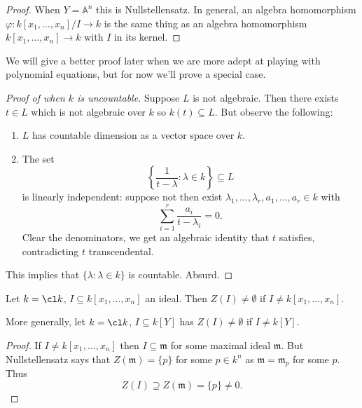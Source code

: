 \documentclass[a4paper]{article}
\renewcommand{\A}{\mathbb{A}}
\begin{document}
\begin{proof}
  When \(Y = \A^n\) this is Nullstellensatz. In general, an algebra homomorphism \(\varphi: k[x_1, \dots, x_n]/I \to k\) is the same thing as an algebra homomorphism \(k[x_1, \dots, x_n] \to k\) with \(I\) in its kernel.
\end{proof}

We will give a better proof later when we are more adept at playing with polynomial equations, but for now we'll prove a special case.

\begin{proof}[Proof of  when \(k\) is uncountable]
  Suppose \(L\) is not algebraic. Then there exists \(t \in L\) which is not algebraic over \(k\) so \(k(t) \subseteq L\). But observe the following:
  \begin{enumerate}
  \item \(L\) has countable dimension as a vector space over \(k\).
  \item The set
    \[
      \left\{ \frac{1}{t - \lambda}: \lambda \in k\right\} \subseteq L
    \]
    is linearly independent: suppose not then exist \(\lambda_1, \dots, \lambda_r, a_1, \dots, a_r \in k\) with
    \[
      \sum_{i = 1}^r \frac{a_i}{t - \lambda_i} = 0.
    \]
    Clear the denominators, we get an algebraic identity that \(t\) satisfies, contradicting \(t\) transcendental.
  \end{enumerate}
  This implies that \(\{\lambda: \lambda \in k\}\) is countable. Absurd.
\end{proof}


\begin{corollary}[Nullstellensatz]
  Let \(k = \cl k\), \(I \subseteq k[x_1, \dots, x_n]\) an ideal. Then \(Z(I) \neq \emptyset\) if \(I \neq k[x_1, \dots, x_n]\).

  More generally, let \(k = \cl k\), \(I \subseteq k[Y]\) has \(Z(I) \neq \emptyset\) if \(I \neq k[Y]\).
\end{corollary}

\begin{proof}
  If \(I \neq k[x_1, \dots, x_n]\) then \(I \subseteq \mathfrak m\) for some maximal ideal \(\mathfrak m\). But Nullstellensatz says that \(Z(\mathfrak m) = \{p\}\) for some \(p \in k^n\) as \(\mathfrak m = \mathfrak m_p\) for some \(p\). Thus
  \[
    Z(I) \supseteq Z(\mathfrak m) = \{p\} \neq 0.
  \]
\end{proof}
\end{document}
